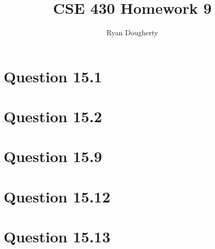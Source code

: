 \documentclass[12pt]{article}
\title{CSE 430 Homework 9}
\author{Ryan Dougherty}
\date{}                                           %
\begin{document}
\maketitle

\section*{Question 15.1}

\section*{Question 15.2}

\section*{Question 15.9}

\section*{Question 15.12}

\section*{Question 15.13} 
\end{document}
